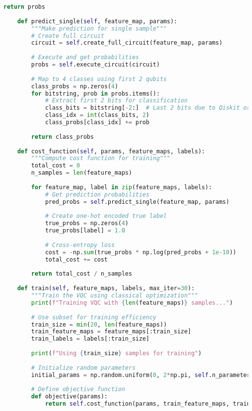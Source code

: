 \documentclass[11pt,a4paper]{article}
\begin{document}
\begin{lstlisting}[language=Python, caption=Complete VQC Implementation]
        return probs
    
    def predict_single(self, feature_map, params):
        """Make prediction for single sample"""
        # Create full circuit
        circuit = self.create_full_circuit(feature_map, params)
        
        # Execute and get probabilities
        probs = self.execute_circuit(circuit)
        
        # Map to 4 classes using first 2 qubits
        class_probs = np.zeros(4)
        for bitstring, prob in probs.items():
            # Extract first 2 bits for classification
            class_bits = bitstring[-2:]  # Last 2 bits due to Qiskit ordering
            class_idx = int(class_bits, 2)
            class_probs[class_idx] += prob
        
        return class_probs
    
    def cost_function(self, params, feature_maps, labels):
        """Compute cost function for training"""
        total_cost = 0
        n_samples = len(feature_maps)
        
        for feature_map, label in zip(feature_maps, labels):
            # Get prediction probabilities
            pred_probs = self.predict_single(feature_map, params)
            
            # Create one-hot encoded true label
            true_probs = np.zeros(4)
            true_probs[label] = 1.0
            
            # Cross-entropy loss
            cost = -np.sum(true_probs * np.log(pred_probs + 1e-10))
            total_cost += cost
        
        return total_cost / n_samples
    
    def train(self, feature_maps, labels, max_iter=30):
        """Train the VQC using classical optimization"""
        print(f"Training VQC with {len(feature_maps)} samples...")
        
        # Use subset for training efficiency
        train_size = min(20, len(feature_maps))
        train_feature_maps = feature_maps[:train_size]
        train_labels = labels[:train_size]
        
        print(f"Using {train_size} samples for training")
        
        # Initialize random parameters
        initial_params = np.random.uniform(0, 2*np.pi, self.n_parameters)
        
        # Define objective function
        def objective(params):
            return self.cost_function(params, train_feature_maps, train_labels)
        

\end{lstlisting}
\end{document}
